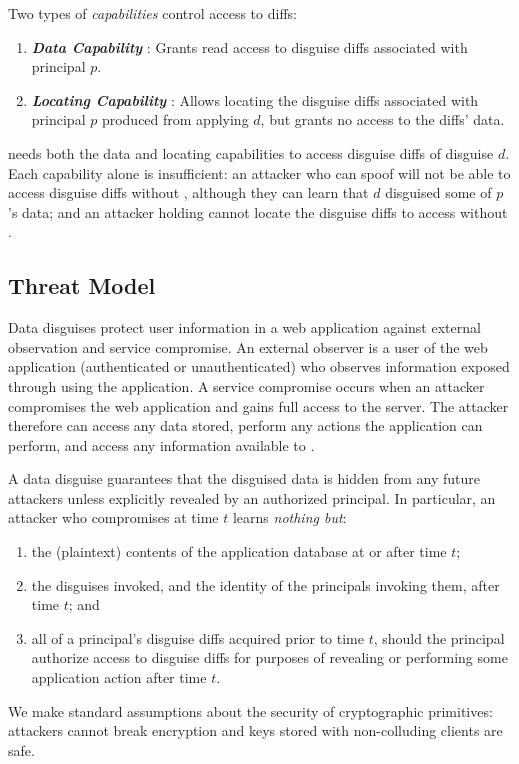 \vspace{6pt}\noindent
Two types of \emph{capabilities} control access to diffs:
\begin{enumerate}
    \item \emph{\textbf{Data Capability }}: Grants read access to disguise diffs 
        associated with principal $p$.
    \item \emph{\textbf{Locating Capability }}: Allows locating the disguise
        diffs associated with principal $p$ produced from applying $d$, but grants no 
        access to the diffs' data.
\end{enumerate}

\noindent \sys needs both the data and locating capabilities  to access
disguise diffs of disguise $d$. Each capability alone is insufficient: an attacker who can spoof
 will not be able to access disguise diffs without , although they can learn
that $d$ disguised some of $p$'s data; and an attacker holding  cannot locate the disguise
diffs to access without .

\subsection{Threat Model}
\label{s:threat}

%
Data disguises protect user information in a web application against external observation
and service compromise.
%
An external observer is a user of the web application (authenticated or unauthenticated) who
observes information exposed through using the application.
%
A service compromise occurs when an attacker compromises the web application and 
gains full access to the server.
%
The attacker therefore can access any data stored, perform any actions the application can
perform, and access any information available to \sys.
%

%
A data disguise guarantees that the disguised data is hidden from any future attackers unless
explicitly revealed by an authorized principal.
%
In particular, an attacker who compromises \sys at time $t$ learns \emph{nothing but}:
\begin{enumerate}[nosep]
  \item the (plaintext) contents of the application database at or after time $t$;
  \item the disguises invoked, and the identity of the principals invoking them, after time $t$; and 
  \item all of a principal's disguise diffs acquired prior to time $t$, should the principal authorize access to
      disguise diffs for purposes of revealing or performing some application action after time $t$.
\end{enumerate}
%
We make standard assumptions about the security of cryptographic primitives: attackers cannot
break encryption and keys stored with non-colluding clients are safe.
%

